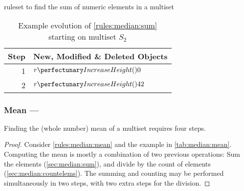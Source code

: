 \begin{cprulesetfloat} \begin{cpruleset}
\end{cpruleset}
\caption{\label{rules:median:sum}\Gls{ruleset} to find the sum of numeric elements in a multiset}
\end{cprulesetfloat}

\begin{table}[htbp]
\centering
   \begin{tabular}{|r|l|}
    \hline
    \textbf{Step} & \textbf{New, Modified \& Deleted Objects} \\ \hline
    1 & \(\cpfunc{r}{0}\)\\ \hline
    2 & \(\cpfunc{r}{42}\)\\ \hline

\end{tabular}
\caption[Example evolution of \cref{rules:median:sum}]{\label{tab:median:sum}Example evolution of \cref{rules:median:sum} starting on multiset \(S_2\)}
\end{table}

\subsubsection{Mean --- }\label{sec:median:mean}

\begin{proposition}\label{prop:median:mean}
Finding the (whole number) mean of a multiset requires four steps.
\end{proposition}

\begin{proof}
Consider \cref{rules:median:mean} and the example in \cref{tab:median:mean}.  Computing the mean is mostly a combination of two previous operations:  Sum the elements (\cref{sec:median:sum}), and divide by the count of elements (\cref{sec:median:countelems}).  The summing and counting may be performed simultaneously in two steps, with two extra steps for the division.
\end{proof}

